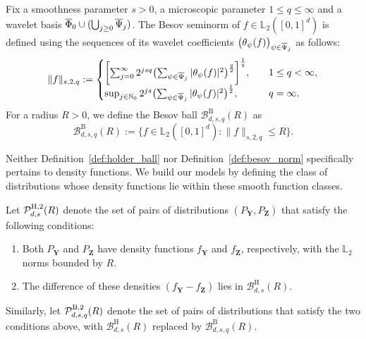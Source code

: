 \documentclass[twoside,11pt]{article}
\newcommand{\distClassGeneric}{\mathcal{P}}
\newcommand{\Ell}{\mathbb{L}}
\newcommand{\EllTwo}{\Ell_2} %
\newcommand{\vectorize}[1]{\mathbf{#1}}
\newcommand{\dimDensity}{d} %
\newcommand{\smoothness}{s}
\newcommand{\ballRadius}{R}
\newcommand{\wavMotherFunc}{\psi} %
\newcommand{\WavFatherBasisSet}{\overline{\Phi}}
\newcommand{\WavMotherBasisSet}{\overline{\uppercase{\Psi}}}
\newcommand{\besovParamMicroscope}{q}
\newcommand{\resLev}{j}
\newcommand{\wavCoef}{\theta}
\newcommand{\wavGenericMotherCoef}{\wavCoef_{\wavMotherFunc}}
\newcommand{\domainTs}{
	[0,1]^{{\dimDensity}}
}
\newcommand{\ballDistn}{\mathcal{B}}
\newcommand{\besovBall}[2]{\ballDistn_{\dimDensity,\smoothness, #2}^{\mathrm{B}}(\ballRadius)}
\newcommand{\holderBall}{\ballDistn_{\dimDensity, \smoothness}^{\mathrm{H}}(\ballRadius)} %
\newcommand{\pBesovTs}{ %
	\distClassGeneric_{%
		\dimDensity, \smoothness, \besovParamMicroscope
	}^{%
		\mathrm{B,2}
	}
	(\ballRadius)
}
\newcommand{\pHolderTs}{ %
	\distClassGeneric_{%
		\dimDensity, \smoothness
	}^{%
		\mathrm{H,2}
	}
	(\ballRadius)
}
\begin{document}
\begin{definition}\label{def:besov_norm}
	Fix a smoothness parameter $\smoothness>0$, a microscopic parameter  $1 \leq \besovParamMicroscope \leq \infty$ and a wavelet basis $
	\WavFatherBasisSet_{0}
	\cup
	(
	\bigcup_{\resLev \geq 0}
	\WavMotherBasisSet_{\resLev} 
	)
	$.
	The Besov seminorm of $f \in \mathbb{L}_2(\domainTs)$ is defined using the sequences of its wavelet coefficients
	$\bigl(\wavGenericMotherCoef(f)\bigr)_{\wavMotherFunc \in \WavMotherBasisSet_{\resLev}}$ as follows:
	\begin{align*}
		\|f\|_{\smoothness,2, \besovParamMicroscope}
		:=
		\begin{cases}
			\biggl[
			\sum_{\resLev=0}^\infty
			2^{\resLev \smoothness \besovParamMicroscope}
			\bigl(
			\sum_{\wavMotherFunc \in \WavMotherBasisSet_{\resLev}}
			|
			\wavGenericMotherCoef(f)
			|^2
			\bigr)^{\frac{\besovParamMicroscope}{2}}
			\biggr]^{\frac{1}{\besovParamMicroscope}},
			\quad
			&1 \leq \besovParamMicroscope < \infty,
			\\
			\sup_{j \in \mathbb{N}_0}
			2^{ \resLev \smoothness}
			\bigl(
			\sum_{\wavMotherFunc \in \WavMotherBasisSet_{\resLev}}
			|
			\wavGenericMotherCoef(f)
			|^2
			\bigr)^{\frac{1}{2}},
			\quad
			&\besovParamMicroscope = \infty.
		\end{cases}
	\end{align*}
	For a radius $\ballRadius > 0$, we define the Besov ball  $\besovBall{2}{\besovParamMicroscope} $ as
	\begin{equation*}
		\besovBall{2}{\besovParamMicroscope} :=
		\{f \in \mathbb{L}_2(\domainTs) : \|f\|_{\smoothness,2, \besovParamMicroscope} \leq \ballRadius\}.
	\end{equation*}
\end{definition}
Neither Definition~\ref{def:holder_ball} nor Definition~\ref{def:besov_norm} specifically pertains to density functions. We build our models by defining the class of  distributions whose density functions lie within these smooth function classes.
\begin{definition}\label{def:smooth_distribution_class}
	Let $\pHolderTs$ denote the set of pairs of distributions $(P_{\vectorize{Y}},P_{\vectorize{Z}})$ that satisfy the following conditions:
	\begin{enumerate}
		\item Both $P_{\vectorize{Y}}$ and $P_{\vectorize{Z}}$ have density functions $f_{\vectorize{Y}}$ and $f_{\vectorize{Z}}$, respectively, with the $\EllTwo$ norms bounded by $\ballRadius$.
		\item The difference of these densities $(f_{\vectorize{Y}}- f_{\vectorize{Z}})$ lies in $\holderBall$. 
	\end{enumerate}
	Similarly, let $\pBesovTs$ denote the set of pairs of distributions that satisfy the two conditions above, with $\holderBall$ replaced by $\besovBall{2}{q}$.  
\end{definition}
\end{document}

